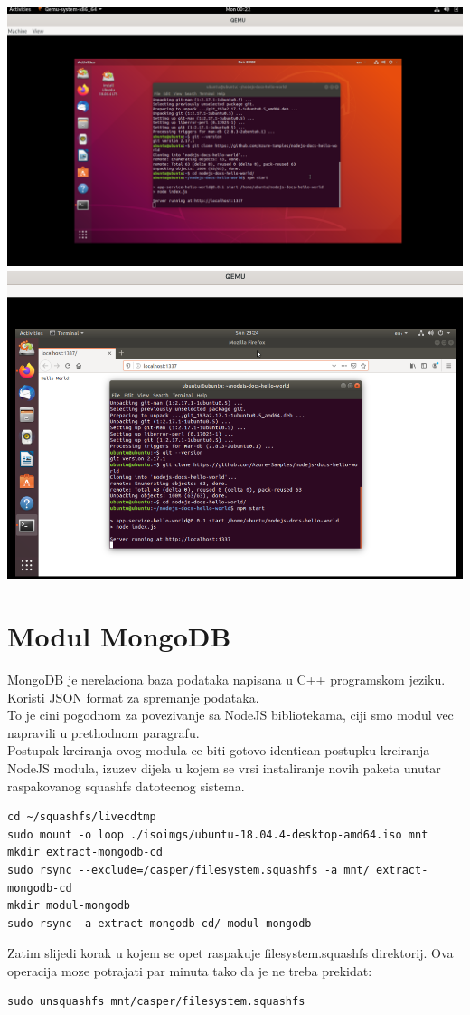 \documentclass[12pt,vi]{mitthesis}
\begin{document}
\includegraphics[width=\linewidth]{images/ModulNodeJSUbuntuTerminal.png}\\
\includegraphics[width=\linewidth]{images/ModulNodeJSUbuntu1.png} 

\chapter*{Modul MongoDB}
MongoDB je nerelaciona baza podataka napisana u C++ programskom jeziku. Koristi JSON format za spremanje podataka.\\
To je cini pogodnom za povezivanje sa NodeJS bibliotekama, ciji smo modul vec napravili u prethodnom paragrafu.\\
Postupak kreiranja ovog modula ce biti gotovo identican postupku kreiranja NodeJS modula, izuzev dijela u kojem se vrsi instaliranje novih paketa unutar raspakovanog squashfs datotecnog sistema.\\
\begin{lstlisting}[style=BashInputStyle]
cd ~/squashfs/livecdtmp
sudo mount -o loop ./isoimgs/ubuntu-18.04.4-desktop-amd64.iso mnt
mkdir extract-mongodb-cd
sudo rsync --exclude=/casper/filesystem.squashfs -a mnt/ extract-mongodb-cd
mkdir modul-mongodb
sudo rsync -a extract-mongodb-cd/ modul-mongodb
\end{lstlisting}
Zatim slijedi korak u kojem se opet raspakuje filesystem.squashfs direktorij. Ova operacija moze potrajati par minuta tako da je ne treba prekidat:\\
\begin{lstlisting}[style=BashInputStyle]
sudo unsquashfs mnt/casper/filesystem.squashfs
\end{lstlisting}
\end{document}
